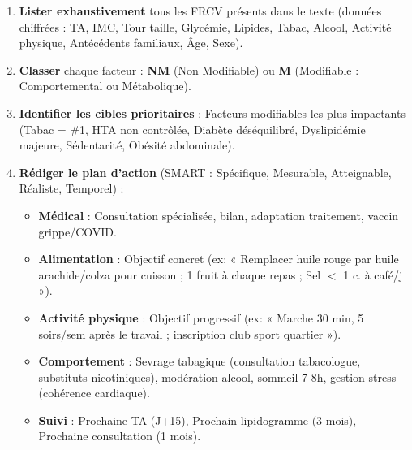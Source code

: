 \documentclass[11pt]{article}
\begin{document}
\begin{methode}
\begin{enumerate}
    \item \textbf{Lister exhaustivement} tous les FRCV présents dans le texte (données chiffrées : TA, IMC, Tour taille, Glycémie, Lipides, Tabac, Alcool, Activité physique, Antécédents familiaux, Âge, Sexe).
    \item \textbf{Classer} chaque facteur : \textbf{NM} (Non Modifiable) ou \textbf{M} (Modifiable : Comportemental ou Métabolique).
    \item \textbf{Identifier les cibles prioritaires} : Facteurs modifiables les plus impactants (Tabac = \#1, HTA non contrôlée, Diabète déséquilibré, Dyslipidémie majeure, Sédentarité, Obésité abdominale).
    \item \textbf{Rédiger le plan d'action} (SMART : Spécifique, Mesurable, Atteignable, Réaliste, Temporel) :
    \begin{itemize}
        \item \textbf{Médical} : Consultation spécialisée, bilan, adaptation traitement, vaccin grippe/COVID.
        \item \textbf{Alimentation} : Objectif concret (ex: « Remplacer huile rouge par huile arachide/colza pour cuisson ; 1 fruit à chaque repas ; Sel $<$ 1 c. à café/j »).
        \item \textbf{Activité physique} : Objectif progressif (ex: « Marche 30 min, 5 soirs/sem après le travail ; inscription club sport quartier »).
        \item \textbf{Comportement} : Sevrage tabagique (consultation tabacologue, substituts nicotiniques), modération alcool, sommeil 7-8h, gestion stress (cohérence cardiaque).
        \item \textbf{Suivi} : Prochaine TA (J+15), Prochain lipidogramme (3 mois), Prochaine consultation (1 mois).
    \end{itemize}
\end{enumerate}
\end{methode}
\end{document}
